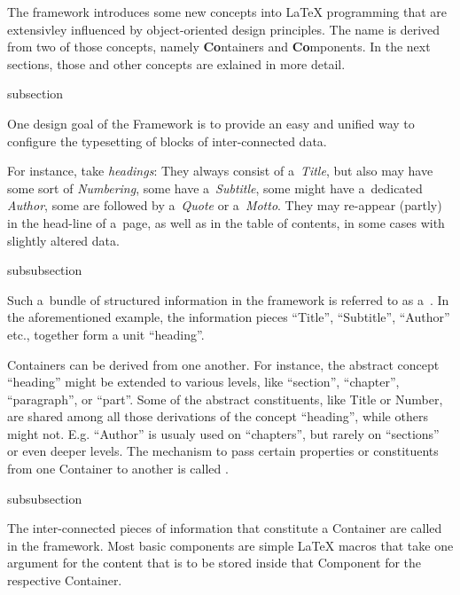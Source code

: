 The framework introduces some new concepts into {\LaTeX} programming
that are extensivley influenced by object-oriented design principles.
The name {\CoCoTeX} is derived from two of those concepts, namely
\textbf{Co}ntainers and \textbf{Co}mponents. In the next sections,
those and other concepts are exlained in more detail.



\begin{Heading}[label=sec:concepts]{subsection}
\end{Heading}

One design goal of the {\CoCoTeX} Framework is to provide an easy and
unified way to configure the typesetting of blocks of inter-connected
data.

For instance, take \textit{headings}: They always consist of
a~\textit{Title}, but also may have some sort of \textit{Numbering},
some have a~\textit{Subtitle}, some might have a~dedicated
\textit{Author}, some are followed by a~\textit{Quote} or
a~\textit{Motto}. They may re-appear (partly) in the head-line of
a~page, as well as in the table of contents, in some cases with
slightly altered data.


\begin{Heading}[label=sec:overview.containers]{subsubsection}
\end{Heading}

Such a~bundle of structured information in the {\CoCoTeX} framework is
referred to as a~. In the
aforementioned example, the information pieces “Title”, “Subtitle”,
“Author” etc., together form a unit “heading”.

Containers can be derived from one another. For instance, the abstract
concept “heading” might be extended to various levels, like “section”,
“chapter”, “paragraph”, or “part”. Some of the abstract constituents,
like Title or Number, are shared among all those derivations of the
concept “heading”, while others might not. E.g. “Author” is usualy
used on “chapters”, but rarely on “sections” or even deeper
levels. The mechanism to pass certain properties or constituents from
one Container to another is called
.


\begin{Heading}[label=sec:overview.components]{subsubsection}
\end{Heading}

The inter-connected pieces of information that constitute a Container
are called  in the
{\CoCoTeX} framework. Most basic components are simple {\LaTeX} macros
that take one argument for the content that is to be stored inside
that Component for the respective Container.

